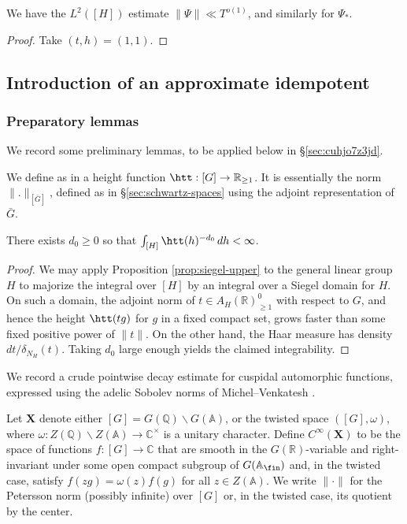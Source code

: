 \begin{corollary}\label{cor:standard2:we-have-psi}
  We have the $L^2([H])$ estimate $\|\Psi \| \ll T^{o(1)}$, and similarly for $\Psi_{\ast}$.
\end{corollary}
\begin{proof}
  Take $(t,h) = (1,1)$.
\end{proof}


\subsection{Introduction of an approximate idempotent}\label{sec:intr-an-appr}


\subsubsection{Preparatory lemmas}\label{sec:cuhjo7ygb4}
We record some preliminary lemmas, to be applied below in \S\ref{sec:cuhjo7z3jd}.

We define as in \cite[\S2.1.7]{michel-2009} a height function $\htt : [G] \rightarrow \mathbb{R}_{\geq 1}$.  It is essentially the norm $\|.\|_{[\bar{G}]}$, defined as in \S\ref{sec:schwartz-spaces} using the adjoint representation of $\bar{G}$.

\begin{lemma}\label{lem:standard:ht-neg-power-integrable-over-H}
  There exists $d_0 \geq 0$ so that $\int_{[H]} \htt(h)^{-d_0} \, d h < \infty$.
\end{lemma}
\begin{proof}
  We may apply Proposition \ref{prop:siegel-upper} to the general linear group $H$ to majorize the integral over $[H]$ by an integral over a Siegel domain for $H$.  On such a domain, the adjoint norm of $t \in A_H(\mathbb{R})^0_{\geq 1}$ with respect to $G$, and hence the height $\htt(t g)$ for $g$ in a fixed compact set, grows faster than some fixed positive power of $\lVert t \rVert$.  On the other hand, the Haar measure has density $d t/\delta_{N_H}(t)$.  Taking $d_0$ large enough yields the claimed integrability.
\end{proof}

We record a crude pointwise decay estimate for cuspidal automorphic functions, expressed using the adelic Sobolev norms of Michel--Venkatesh \cite[\S2]{michel-2009}.

Let \(\mathbf{X}\) denote either \([G]=G(\mathbb{Q})\backslash G(\mathbb{A})\), or the twisted space \(([G],\omega)\), where \(\omega:Z(\mathbb{Q})\backslash Z(\mathbb{A})\to \mathbb{C}^\times\) is a unitary character.  Define \(C^\infty(\mathbf{X})\) to be the space of functions \(f:[G]\to \mathbb{C}\) that are smooth in the \(G(\mathbb{R})\)-variable and right-invariant under some open compact subgroup of \(G(\mathbb{A}_{\fin})\) and, in the twisted case, satisfy \(f(zg)=\omega(z)f(g)\) for all \(z\in Z(\mathbb{A})\).  We write \(\|\cdot\|\) for the Petersson norm (possibly infinite) over $[G]$ or, in the twisted case, its quotient by the center.

